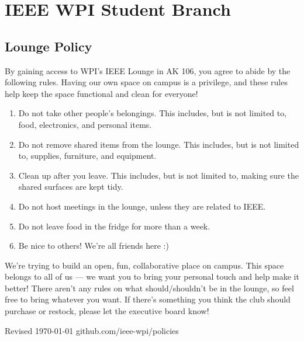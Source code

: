 \documentclass{report}
\begin{document}
\section*{IEEE WPI Student Branch}
\subsection*{Lounge Policy}
By gaining access to WPI's IEEE Lounge in AK 106, you agree to abide by the following rules. Having our own space on campus is a privilege, and these rules help keep the space functional and clean for everyone!

\begin{enumerate}
    \item{Do not take other people's belongings. This includes, but is not limited to, food, electronics, and personal items.}
    \item{Do not remove shared items from the lounge. This includes, but is not limited to, supplies, furniture, and equipment.}
    \item{Clean up after you leave. This includes, but is not limited to, making sure the shared surfaces are kept tidy.}
    \item{Do not host meetings in the lounge, unless they are related to IEEE.}
    \item{Do not leave food in the fridge for more than a week.}
    \item{Be nice to others! We're all friends here :)}
\end{enumerate}

\noindent We're trying to build an open, fun, collaborative place on campus. This space belongs to all of us — we want you to bring your personal touch and help make it better! There aren't any rules on what should/shouldn't be in the lounge, so feel free to bring whatever you want. If there's something you think the club should purchase or restock, please let the executive board know!

\vspace{\fill}
\noindent \normalsize{Revised \today}
\hspace{\fill}
github.com/ieee-wpi/policies
\end{document}
